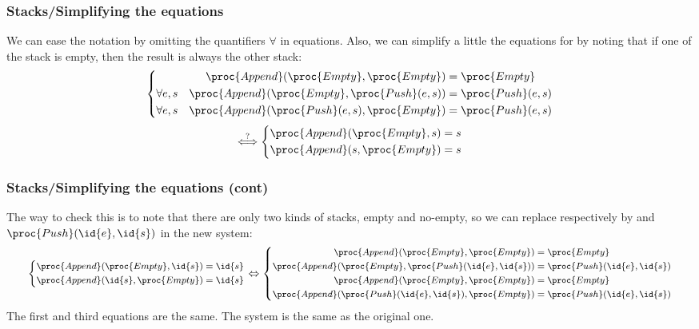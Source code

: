 %
\begin{frame}
\frametitle{Stacks/Simplifying the equations}

We can ease the notation by omitting the quantifiers \(\forall\) in
equations. Also, we can simplify a little the equations for
 by noting that if one of the stack is empty, then the
result is always the other stack:
\[
\left\{
\begin{aligned}
   \proc{Append} (\proc{Empty}, \proc{Empty}) 
&= \proc{Empty}\\
   \forall e, s \quad \proc{Append} (\proc{Empty},
   \proc{Push} (e, s)) 
&= \proc{Push} (e, s)\\
   \forall e, s \quad \proc{Append} (\proc{Push}
   (e, s), \proc{Empty}) 
&= \proc{Push} (e, s)
\end{aligned}
\right.
\]
\[
\stackrel{?}{\Longleftrightarrow}
\left\{
\begin{aligned}
\proc{Append} (\proc{Empty}, s) &= s\\
\proc{Append} (s, \proc{Empty}) &= s
\end{aligned}
\right.
\]

\end{frame}

%
\begin{frame}
\frametitle{Stacks/Simplifying the equations (cont)}

The way to check this is to note that there are only two kinds of
stacks, empty and no-empty, so we can replace  respectively by
 and \(\proc{Push} (\id{e}, \id{s})\) in the new system:
\[\footnotesize
\left\{
\begin{aligned}
\proc{Append} (\proc{Empty}, \id{s}) &= \id{s}\\
\proc{Append} (\id{s}, \proc{Empty}) &= \id{s}
\end{aligned}
\right.
\Leftrightarrow
\left\{
\begin{aligned}
\proc{Append} (\proc{Empty}, \proc{Empty}) &= \proc{Empty}\\
\proc{Append} (\proc{Empty}, \proc{Push} (\id{e}, \id{s})) &=
\proc{Push} (\id{e}, \id{s})\\
\proc{Append} (\proc{Empty}, \proc{Empty}) &= \proc{Empty}\\
\proc{Append} (\proc{Push} (\id{e}, \id{s}), \proc{Empty}) &=
\proc{Push} (\id{e}, \id{s})
\end{aligned}
\right.
\]
The first and third equations are the same. The system is the same as
the original one.
\end{frame}

